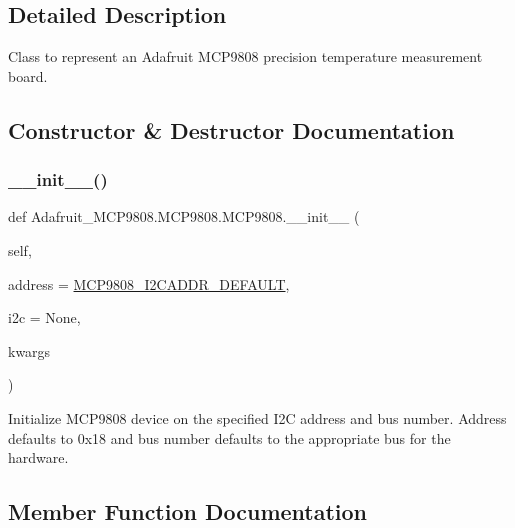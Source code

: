 \subsection{Detailed Description}
\begin{DoxyVerb}Class to represent an Adafruit MCP9808 precision temperature measurement
board.
\end{DoxyVerb}
 

\subsection{Constructor \& Destructor Documentation}
\mbox{\label{classAdafruit__MCP9808_1_1MCP9808_1_1MCP9808_a6c7c1f671a5a3224bb7e081ea5811d06}} 
\subsubsection{\texorpdfstring{\+\_\+\+\_\+init\+\_\+\+\_\+()}{\_\_init\_\_()}}
{\footnotesize\ttfamily def Adafruit\+\_\+\+M\+C\+P9808.\+M\+C\+P9808.\+M\+C\+P9808.\+\_\+\+\_\+init\+\_\+\+\_\+ (\begin{DoxyParamCaption}\item[{}]{self,  }\item[{}]{address = {\ttfamily \hyperlink{namespaceAdafruit__MCP9808_1_1MCP9808_a6f8ad8887f9b71037409b4067c218e8e}{M\+C\+P9808\+\_\+\+I2\+C\+A\+D\+D\+R\+\_\+\+D\+E\+F\+A\+U\+LT}},  }\item[{}]{i2c = {\ttfamily None},  }\item[{}]{kwargs }\end{DoxyParamCaption})}

\begin{DoxyVerb}Initialize MCP9808 device on the specified I2C address and bus number.
Address defaults to 0x18 and bus number defaults to the appropriate bus
for the hardware.
\end{DoxyVerb}
 

\subsection{Member Function Documentation}
\mbox{\label{classAdafruit__MCP9808_1_1MCP9808_1_1MCP9808_ab62a703ef4cf09887846d3eeaa401772}} 
